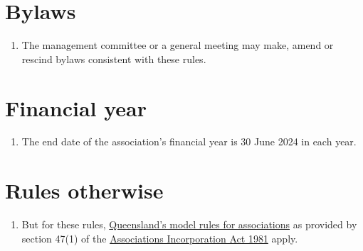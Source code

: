 \documentclass[11pt, oneside]{article}
\begin{document}
\section{Bylaws}
\begin{enumerate}
\item The management committee or a general meeting may make, amend or rescind bylaws consistent with these rules.
\end{enumerate}

\section{Financial year}
\begin{enumerate}
\item The end date of the association’s financial year is 30 June 2024 in each year.
\end{enumerate}

\section{Rules otherwise}
\begin{enumerate}
\item But for these rules, \href{https://www.qld.gov.au/law/laws-regulated-industries-and-accountability/queensland-laws-and-regulations/associations-charities-and-non-for-profits/incorporated-associations/running-an-incorporated-association/rules-for-associations}{Queensland’s model rules for associations} as provided by section 47(1) of the \href{https://www.legislation.qld.gov.au/view/html/inforce/current/act-1981-074}{Associations Incorporation Act 1981} apply.
\end{enumerate}
\end{document}
